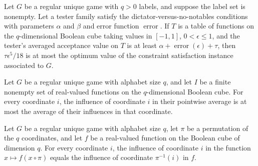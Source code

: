 \begin{theorem}
\label{FABL.RegularUniqueGame.excess_mul_epsilon_pow_five_div_eighteen_le_optimum}
\leanok
{}
Let $G$ be a regular unique game with $q>0$ labels, and suppose the label set is
nonempty. Let a tester family satisfy the dictator-versus-no-notables conditions with
parameters $\alpha$ and $\beta$ and error function $\operatorname{error}$. If $T$ is a
table of functions on the $q$-dimensional Boolean cube taking values in $[-1,1]$,
$0<\epsilon\le1$, and the tester’s averaged acceptance value on $T$ is at least
$\alpha+\operatorname{error}(\epsilon)+\tau$, then $\tau\epsilon^5/18$ is at most the
optimum value of the constraint satisfaction instance associated to $G$.
\end{theorem}

\begin{theorem}
\label{FABL.RegularUniqueGame.influence_uniformExpectation_le}
\leanok
{}
Let $G$ be a regular unique game with alphabet size $q$, and let $I$ be a finite
nonempty set of real-valued functions on the $q$-dimensional Boolean cube. For every
coordinate $i$, the influence of coordinate $i$ in their pointwise average is at most
the average of their influences in that coordinate.
\end{theorem}

\begin{theorem}
\label{FABL.RegularUniqueGame.influence_comp_permuteInput}
\leanok
{}
Let $G$ be a regular unique game with alphabet size $q$, let $\pi$ be a permutation of
the $q$ coordinates, and let $f$ be a real-valued function on the Boolean cube of
dimension $q$. For every coordinate $i$, the influence of coordinate $i$ in the function
$x\mapsto f(x\circ\pi)$ equals the influence of coordinate $\pi^{-1}(i)$ in $f$.
\end{theorem}


